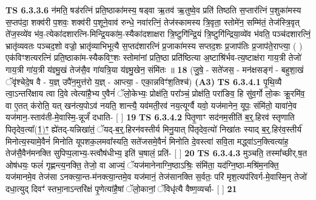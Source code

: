 \documentclass[17pt]{extarticle}
\begin{document}
                  \newline
                                \textbf{ TS 6.3.3.6} \newline
                  न॑मति॒ षड॑रत्निं प्रति॒ष्ठाका॑मस्य॒ षड्वा ऋ॒तव॑ ऋ॒तुष्वे॒व प्रति॑ तिष्ठति स॒प्तार॑त्निं प॒शुका॑मस्य स॒प्तप॑दा॒ शक्व॑री प॒शवः॒ शक्व॑री प॒शूने॒वाव॑ रुन्धे॒ नवा॑रत्निं॒ तेज॑स्कामस्य त्रि॒वृता॒ स्तोमे॑न॒ सम्मि॑तं॒ तेज॑स्त्रि॒वृत् ते॑ज॒स्व्ये॑व भ॑व॒-त्येका॑दशारत्नि-मिन्द्रि॒यका॑म॒-स्यैका॑दशाक्षरा त्रि॒ष्टुगि॑न्द्रि॒यं त्रि॒ष्टुगि॑न्द्रिया॒व्ये॑व भ॑वति॒ पञ्च॑दशारत्निं॒ भ्रातृ॑व्यवतः पञ्चद॒शो वज्रो॒ भ्रातृ॑व्याभिभूत्यै स॒प्तद॑शारत्निं प्र॒जाका॑मस्य सप्तद॒शः प्र॒जाप॑तिः प्र॒जाप॑ते॒राप्त्या॒ ( ) एक॑विꣳशत्यरत्निं प्रति॒ष्ठाका॑म-स्यैकविꣳ॒॒शः स्तोमा॑नां प्रति॒ष्ठा प्रति॑ष्ठित्या अ॒ष्टाश्रि॑र्भव-त्य॒ष्टाक्ष॑रा गाय॒त्री तेजो॑ गाय॒त्री गा॑य॒त्री य॑ज्ञ्मु॒खं तेज॑सै॒व गा॑यत्रि॒या य॑ज्ञ्मु॒खेन॒ संमि॑तः ॥ \textbf{  18 } \newline
                  \newline
                      (जु॒षे॒ - सते॑जस॒ - मन॑क्षसङ्गं - बहुशा॒खं ॅवृ॑श्चेदे॒ष वै - य॒ज्ञ् उपै॑न॒मुत्त॑रो य॒ज्ञ् - आप्त्या॒ - एका॒न्नविꣳ॑श॒तिश्च॑)  \textbf{(A3)} \newline \newline
                                        \textbf{ TS 6.3.4.1} \newline
                  पृ॒थि॒व्यै त्वा॒ऽन्तरि॑क्षाय त्वा दि॒वे त्वेत्या॑है॒भ्य ए॒वैनं॑ ॅलो॒केभ्यः॒ प्रोक्ष॑ति॒ परा᳚ञ्चं॒ प्रोक्ष॑ति॒ परा॑ङिव॒ हि सु॑व॒र्गो लो॒कः क्रू॒रमि॑व॒ वा ए॒तत् क॑रोति॒ यत् खन॑त्य॒पोऽव॑ नयति॒ शान्त्यै॒ यव॑मती॒रव॑ नय॒त्यूर्ग्वै यवो॒ यज॑मानेन॒ यूपः॒ संमि॑तो॒ यावा॑ने॒व यज॑मान॒-स्ताव॑ती-मे॒वास्मि॒-न्नूर्जं॑ दधाति- [  ] \textbf{  19} \newline
                  \newline
                                \textbf{ TS 6.3.4.2} \newline
                  पितृ॒णाꣳ सद॑नम॒सीति॑ ब॒र्॒.हिरव॑ स्तृणाति पितृदेव॒त्या᳚(1॒)ꣳ॒ ह्ये॑तद्-यन्निखा॑तं॒ ॅयद्-ब॒र्॒.हिरन॑वस्तीर्य मिनु॒यात् पि॑तृदेव॒त्यो॑ निखा॑तः स्याद् ब॒र्॒.हिर॑व॒स्तीर्य॑ मिनोत्य॒स्यामे॒वैनं॑ मिनोति यूपशक॒लमवा᳚स्यति॒ सते॑जसमे॒वैनं॑ मिनोति दे॒वस्त्वा॑ सवि॒ता मद्ध्वा॑ऽन॒क्त्वित्या॑ह॒ तेज॑सै॒वैन॑मनक्ति सुपिप्प॒लाभ्य॒-स्त्वौष॑धीभ्य॒ इति॑ च॒षालं॒ प्रति॑- [  ] \textbf{  20} \newline
                  \newline
                                \textbf{ TS 6.3.4.3} \newline
                  मुञ्चति॒ तस्मा᳚च्छीर्.ष॒त ओष॑धयः॒ फलं॑ गृह्णन्त्य॒नक्ति॒ तेजो॒ वा आज्यं॒ ॅयज॑मानेनाग्नि॒ष्ठाऽश्रिः॒ संमि॑ता॒ यद॑ग्नि॒ष्ठा-मश्रि॑म॒नक्ति॒ यज॑मानमे॒व तेज॑सा ऽनक्त्या॒न्त-म॑नक्त्या॒न्तमे॒व यज॑मानं॒ तेज॑सानक्ति स॒र्वतः॒ परि॑ मृश॒त्यप॑रिवर्ग-मे॒वास्मि॒न् तेजो॑ दधा॒त्युद् दिवꣳ॑ स्तभा॒नाऽन्तरि॑क्षं पृ॒णेत्या॑है॒षां ॅलो॒कानां॒ ॅविधृ॑त्यै वैष्ण॒व्यर्चा- [  ] \textbf{  21} \newline
\end{document}
